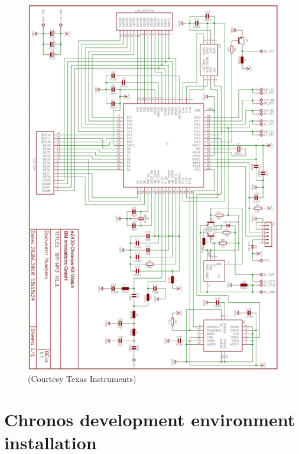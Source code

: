 \begin{figure}[h]
  \centering
  \includegraphics[width=1.0\textwidth]{img/watch_schematics.png}
  \caption{(Courtesy Texas Instruments)}
\end{figure}

\appendix
\chapter{Chronos development environment installation}
\label{appendix:env_install}


